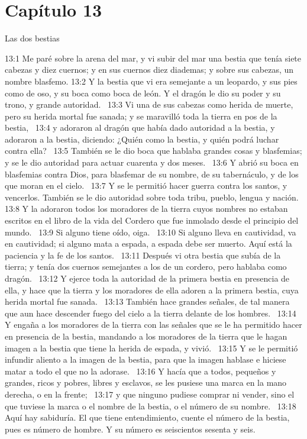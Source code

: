 \section*{Capítulo 13}
Las dos bestias  

13:1 Me paré sobre la arena del mar, y vi subir del mar una bestia que tenía siete cabezas y diez cuernos; y en sus cuernos diez diademas; y sobre sus cabezas, un nombre blasfemo. 
13:2 Y la bestia que vi era semejante a un leopardo, y sus pies como de oso, y su boca como boca de león. Y el dragón le dio su poder y su trono, y grande autoridad.  
13:3 Vi una de sus cabezas como herida de muerte, pero su herida mortal fue sanada; y se maravilló toda la tierra en pos de la bestia,  
13:4 y adoraron al dragón que había dado autoridad a la bestia, y adoraron a la bestia, diciendo: ¿Quién como la bestia, y quién podrá luchar contra ella?  
13:5 También se le dio boca que hablaba grandes cosas y blasfemias; y se le dio autoridad para actuar cuarenta y dos meses.  
13:6 Y abrió su boca en blasfemias contra Dios, para blasfemar de su nombre, de su tabernáculo, y de los que moran en el cielo.  
13:7 Y se le permitió hacer guerra contra los santos, y vencerlos. También se le dio autoridad sobre toda tribu, pueblo, lengua y nación.  
13:8 Y la adoraron todos los moradores de la tierra cuyos nombres no estaban escritos en el libro de la vida del Cordero que fue inmolado desde el principio del mundo.  
13:9 Si alguno tiene oído, oiga.  
13:10 Si alguno lleva en cautividad, va en cautividad; si alguno mata a espada, a espada debe ser muerto. Aquí está la paciencia y la fe de los santos.  
13:11 Después vi otra bestia que subía de la tierra; y tenía dos cuernos semejantes a los de un cordero, pero hablaba como dragón.  
13:12 Y ejerce toda la autoridad de la primera bestia en presencia de ella, y hace que la tierra y los moradores de ella adoren a la primera bestia, cuya herida mortal fue sanada.  
13:13 También hace grandes señales, de tal manera que aun hace descender fuego del cielo a la tierra delante de los hombres.  
13:14 Y engaña a los moradores de la tierra con las señales que se le ha permitido hacer en presencia de la bestia, mandando a los moradores de la tierra que le hagan imagen a la bestia que tiene la herida de espada, y vivió.  
13:15 Y se le permitió infundir aliento a la imagen de la bestia, para que la imagen hablase e hiciese matar a todo el que no la adorase.  
13:16 Y hacía que a todos, pequeños y grandes, ricos y pobres, libres y esclavos, se les pusiese una marca en la mano derecha, o en la frente;  
13:17 y que ninguno pudiese comprar ni vender, sino el que tuviese la marca o el nombre de la bestia, o el número de su nombre.  
13:18 Aquí hay sabiduría. El que tiene entendimiento, cuente el número de la bestia, pues es número de hombre. Y su número es seiscientos sesenta y seis.  
